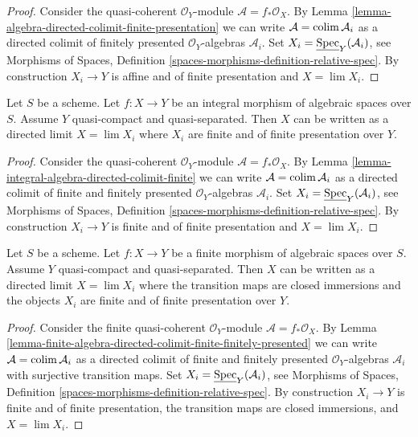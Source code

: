 \begin{proof}
Consider the quasi-coherent $\mathcal{O}_Y$-module
$\mathcal{A} = f_*\mathcal{O}_X$. By
Lemma \ref{lemma-algebra-directed-colimit-finite-presentation}
we can write $\mathcal{A} = \mathop{\mathrm{colim}}\nolimits \mathcal{A}_i$ as a directed
colimit of finitely presented
$\mathcal{O}_Y$-algebras $\mathcal{A}_i$.
Set $X_i = \underline{\mathop{\mathrm{Spec}}}_Y(\mathcal{A}_i)$, see
Morphisms of Spaces, Definition
\ref{spaces-morphisms-definition-relative-spec}.
By construction $X_i \to Y$ is affine and of finite presentation
and $X = \lim X_i$.
\end{proof}

\begin{lemma}
\label{lemma-integral-limit-finite-and-finite-presentation}
Let $S$ be a scheme. Let $f : X \to Y$ be an integral morphism of algebraic
spaces over $S$. Assume $Y$ quasi-compact and quasi-separated.
Then $X$ can be written as a directed limit $X = \lim X_i$
where $X_i$ are finite and of finite presentation over $Y$.
\end{lemma}

\begin{proof}
Consider the quasi-coherent $\mathcal{O}_Y$-module
$\mathcal{A} = f_*\mathcal{O}_X$. By
Lemma \ref{lemma-integral-algebra-directed-colimit-finite}
we can write $\mathcal{A} = \mathop{\mathrm{colim}}\nolimits \mathcal{A}_i$ as a directed
colimit of finite and finitely presented $\mathcal{O}_Y$-algebras
$\mathcal{A}_i$.
Set $X_i = \underline{\mathop{\mathrm{Spec}}}_Y(\mathcal{A}_i)$, see
Morphisms of Spaces, Definition
\ref{spaces-morphisms-definition-relative-spec}.
By construction $X_i \to Y$ is finite and of finite presentation and
$X = \lim X_i$.
\end{proof}

\begin{lemma}
\label{lemma-finite-in-finite-and-finite-presentation}
Let $S$ be a scheme. Let $f : X \to Y$ be a finite morphism of algebraic
spaces over $S$. Assume $Y$ quasi-compact and quasi-separated.
Then $X$ can be written as a directed limit $X = \lim X_i$
where the transition maps are closed immersions and the objects
$X_i$ are finite and of finite presentation over $Y$.
\end{lemma}

\begin{proof}
Consider the finite quasi-coherent $\mathcal{O}_Y$-module
$\mathcal{A} = f_*\mathcal{O}_X$. By
Lemma \ref{lemma-finite-algebra-directed-colimit-finite-finitely-presented}
we can write $\mathcal{A} = \mathop{\mathrm{colim}}\nolimits \mathcal{A}_i$ as a directed
colimit of finite and finitely presented $\mathcal{O}_Y$-algebras
$\mathcal{A}_i$ with surjective transition maps.
Set $X_i = \underline{\mathop{\mathrm{Spec}}}_Y(\mathcal{A}_i)$, see
Morphisms of Spaces, Definition
\ref{spaces-morphisms-definition-relative-spec}.
By construction $X_i \to Y$ is finite and of finite presentation,
the transition maps are closed immersions, and $X = \lim X_i$.
\end{proof}

